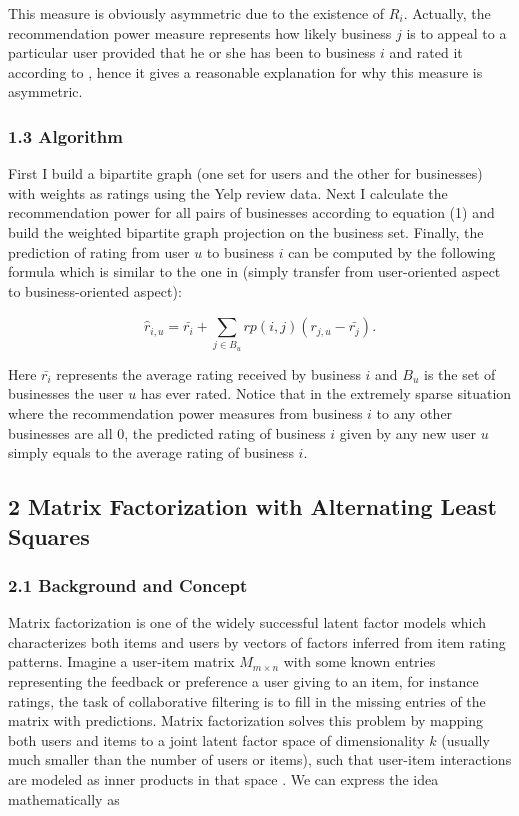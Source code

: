\documentclass{article}
\begin{document}
\indent This measure is obviously asymmetric due to the existence of $R_{i}$. Actually, 
the recommendation power measure represents how likely business $j$ is to appeal to a particular 
user provided that he or she has been to business $i$ and rated it according to \cite{sawant2013collaborative}, hence it gives a 
reasonable explanation for why this measure is asymmetric.

\subsubsection*{1.3  Algorithm}


\noindent First I build a bipartite graph (one set for users and the other for businesses) with 
weights as ratings using the Yelp review data. Next I calculate the recommendation power for all 
pairs of businesses according to equation (1) and build the weighted bipartite graph projection on 
the business set. Finally, the prediction of rating from user $u$ to business $i$ can be computed by the 
following formula which is similar to the one in \cite{sawant2013collaborative} \cite{breese2013empirical}(simply transfer from user-oriented aspect to 
business-oriented aspect):

\begin{equation}
	\hat{r}_{i,u} = \bar{r_{i}}+\sum_{j\in B_{u}}^{}rp\left ( i,j \right )\left ( r_{j,u}-\bar{r_{j}} \right ).
\end{equation}

\noindent Here $\bar{r_{i}}$ represents the average rating received by business $i$ and $B_{u}$ is the set of 
businesses the user $u$ has ever rated. Notice that in the extremely sparse situation where the 
recommendation power measures from business $i$ to any other businesses are all 0, the predicted 
rating of business $i$ given by any new user $u$ simply equals to the average rating of business $i$. 


\subsection*{2  Matrix Factorization with Alternating Least Squares}

\subsubsection*{2.1  Background and Concept}


\noindent Matrix factorization is one of the widely successful latent factor models which 
characterizes both items and users by vectors of factors inferred from item rating patterns. 
Imagine a user-item matrix $M_{m\times n}$ with some known entries representing the feedback or preference 
a user giving to an item, for instance ratings, the task of collaborative filtering is to fill in 
the missing entries of the matrix with predictions. Matrix factorization solves this problem by mapping 
both users and items to a joint latent factor space of dimensionality $k$ (usually much smaller than the 
number of users or items), such that user-item interactions are modeled as inner products in that space 
\cite{koren2009matrix}. We can express the idea mathematically as
\end{document}
